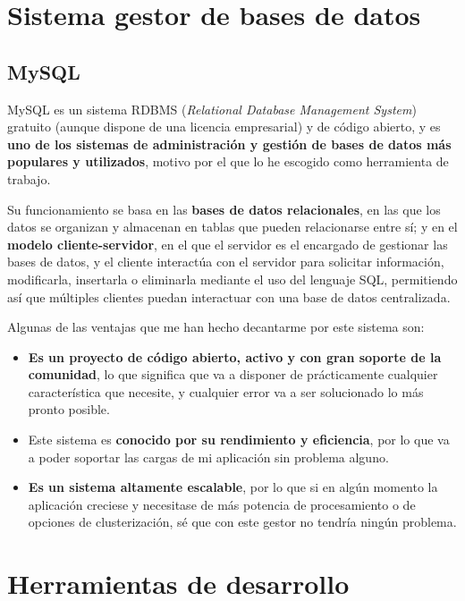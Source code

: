 \section{Sistema gestor de bases de datos}

\subsection{MySQL}

MySQL es un sistema RDBMS (\textit{Relational Database Management System}) gratuito (aunque dispone de una licencia empresarial) y de código abierto, y es \textbf{uno de los sistemas de administración y gestión de bases de datos más populares y utilizados}, motivo por el que lo he escogido como herramienta de trabajo.

Su funcionamiento se basa en las \textbf{bases de datos relacionales}, en las que los datos se organizan y almacenan en tablas que pueden relacionarse entre sí; y en el \textbf{modelo cliente-servidor}, en el que el servidor es el encargado de gestionar las bases de datos, y el cliente interactúa con el servidor para solicitar información, modificarla, insertarla o eliminarla mediante el uso del lenguaje SQL, permitiendo así que múltiples clientes puedan interactuar con una base de datos centralizada. \cite{wikipedia:mysql}

Algunas de las ventajas que me han hecho decantarme por este sistema son:

\begin{itemize}
  \item \textbf{Es un proyecto de código abierto, activo y con gran soporte de la comunidad}, lo que significa que va a disponer de prácticamente cualquier característica que necesite, y cualquier error va a ser solucionado lo más pronto posible.
  \item Este sistema es \textbf{conocido por su rendimiento y eficiencia}, por lo que va a poder soportar las cargas de mi aplicación sin problema alguno.
  \item \textbf{Es un sistema altamente escalable}, por lo que si en algún momento la aplicación creciese y necesitase de más potencia de procesamiento o de opciones de clusterización, sé que con este gestor no tendría ningún problema.
\end{itemize}


\section{Herramientas de desarrollo}

